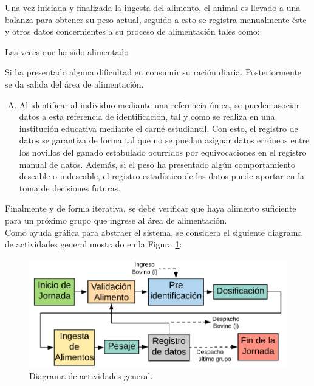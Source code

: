 \begin{inparaenum}[(i)]
	        Una vez iniciada y finalizada la ingesta del alimento, el animal es llevado a una balanza para obtener su peso actual, seguido a esto se registra manualmente éste y otros datos concernientes a su proceso de alimentación tales como:
	        \item Las veces que ha sido alimentado
	        \item Si ha presentado alguna dificultad en consumir su ración diaria. Posteriormente se da salida del área de alimentación.
	    \end{inparaenum}

\begin{enumerate}[O.I \#3:]
    \item Al identificar al individuo mediante una referencia única, se pueden asociar datos a esta referencia de identificación, tal y como se realiza en una institución educativa mediante el carné estudiantil. Con esto, el registro de datos se garantiza de forma tal que no se puedan asignar datos erróneos entre los novillos del ganado estabulado ocurridos por equivocaciones en el registro manual de datos. 
    Además, si el peso ha presentado algún comportamiento deseable o indeseable, el registro estadístico de los datos puede aportar en la toma de decisiones futuras. \label{OI3}
\end{enumerate}

Finalmente y de forma iterativa, se debe verificar que haya alimento suficiente para un próximo grupo que ingrese al área de alimentación.\\

Como ayuda gráfica para abstraer el sistema, se considera el siguiente diagrama de actividades general mostrado en la Figura \ref{dblockspng}:

\begin{figure}[H]
	\begin{center}
		\includegraphics[scale=0.85]{img/dblocksg.png}
	\end{center}
	\caption{Diagrama de actividades general. \label{dblockspng}}
\end{figure}

